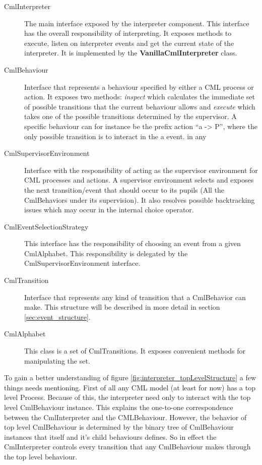 \documentclass[a4paper, 12pt]{include/compassreport}   %
\begin{document}
\begin{description}
\item[CmlInterpreter] The main interface exposed by
  the interpreter component. This interface has the overall
  responsibility of interpreting. It exposes methods to execute, listen
  on interpreter events and get the current state of the interpreter. It
  is implemented by the \textbf{VanillaCmlInterpreter} class.
\item[CmlBehaviour] Interface that represents a behaviour specified by
  either a CML process or action. It exposes two methods: \emph{inspect}
  which calculates the immediate set of possible transitions that the
  current behaviour allows and \emph{execute} which takes one of the
  possible transitions determined by the supervisor. A specific
  behaviour can for instance be the prefix action ``a -> P'', where the
  only possible transition is to interact in the a event.  in any
\item [CmlSupervisorEnvironment] Interface with the responsibility of
  acting as the supervisor environment for CML processes and actions. A
  supervisor environment selects and exposes the next transition/event
  that should occur to its pupils (All the CmlBehaviors under its
  supervision). It also resolves possible backtracking issues which
  may occur in the internal choice operator. 
\item[CmlEventSelectionStrategy] This interface has the responsibility
  of choosing an event from a given CmlAlphabet. This responsibility is
  delegated by the CmlSupervisorEnvironment interface.
\item[CmlTransition] Interface that represents any kind of transition that
  a CmlBehavior can make. This structure will be described in more
  detail in section \ref{sec:event_structure}.
\item[CmlAlphabet] This class is a set of CmlTransitions. It exposes
  convenient methods for manipulating the set.
\end{description}

To gain a better understanding of figure
\ref{fig:interpreter_topLevelStructure} a few things needs
mentioning. First of all any CML model (at least for now) has a top
level Process. Because of this, the interpreter need only to interact
with the top level CmlBehaviour instance. This explains the one-to-one
correspondence between the CmlInterpreter and the
CMLBehaviour. However, the behavior of top level CmlBehaviour is
determined by the binary tree of CmlBehaviour instances that itself
and it's child behaviours defines. So in effect the CmlInterpreter
controls every transition that any CmlBehaviour makes through the top
level behaviour.
\end{document}
